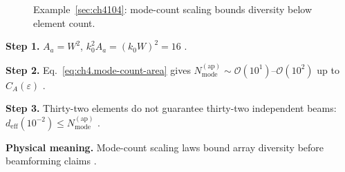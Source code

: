 \begin{figure}[t]
\centering
{}
\caption{Example~\ref{sec:ch4104}: mode-count scaling bounds diversity below element count.}
\label{fig:ch4.ex-mode-count-scaling}
\end{figure}

\textbf{Step 1.} \(A_{a}=W^{2}\), \(k_{0}^{2}A_{a}=(k_{0}W)^{2}=16\) \cite{jackson1999,stratton1941}.

\textbf{Step 2.} Eq.~\eqref{eq:ch4.mode-count-area} gives \(N_{\mathrm{mode}}^{\mathrm{(ap)}}\sim\mathcal{O}(10^{1})\)--\(\mathcal{O}(10^{2})\) up to
\(C_{A}(\varepsilon)\) \cite{hansen1988,collin2001,harrington2001}.

\textbf{Step 3.} Thirty-two elements do not guarantee thirty-two independent beams: \(d_{\mathrm{eff}}(10^{-2})\le N_{\mathrm{mode}}^{\mathrm{(ap)}}\)
\cite{devaney2004,stratton1941}.

\textbf{Physical meaning.} Mode-count scaling laws bound array diversity before beamforming claims \cite{hansen1988}.
